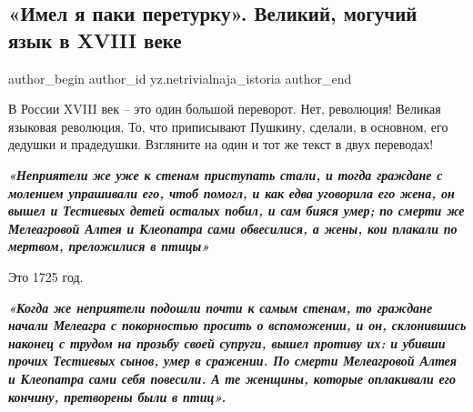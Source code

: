  
 
 
 
 
 
\subsection{«Имел я паки перетурку». Великий, могучий язык в XVIII веке}
\label{sec:05_12_2020.sites.ru.zen_yandex.yz.netrivialnaja_istoria.1.jazyk_xviii_vek}
\ifcmt
	author_begin
   author_id yz.netrivialnaja_istoria
	author_end
\fi


В России XVIII век – это один большой переворот. Нет, революция! Великая
языковая революция. То, что приписывают Пушкину, сделали, в основном, его
дедушки и прадедушки. Взгляните на один и тот же текст в двух переводах!

\begin{leftbar}
  \begingroup
    \em\Large\bfseries\color{blue}
«Неприятели же уже к стенам приступать стали, и тогда граждане с молением упрашивали его, чтоб помогл, и как едва уговорила его жена, он вышел и Тестиевых детей осталых побил, и сам бияся умер; по смерти же Мелеагровой Алтея и Клеопатра сами обвесилися, а жены, кои плакали по мертвом, преложилися в птицы»
  \endgroup
\end{leftbar}
Это 1725 год.

\begin{leftbar}
  \begingroup
    \em\Large\bfseries\color{blue}
«Когда же неприятели подошли почти к самым стенам, то граждане начали Мелеагра
с покорностью просить о вспоможении, и он, склонившись наконец с трудом
на прозьбу своей супруги, вышел противу их: и убивши прочих Тестиевых
сынов, умер в сражении. По смерти Мелеагровой Алтея и Клеопатра сами
себя повесили. А те женщины, которые оплакивали его кончину, претворены
были в птиц».
  \endgroup
\end{leftbar}

